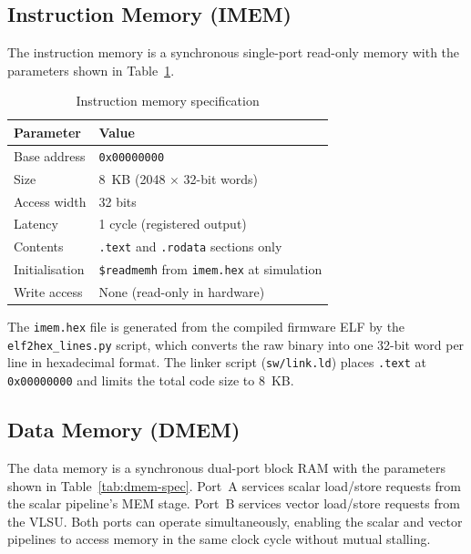 \subsection{Instruction Memory (IMEM)}

The instruction memory is a synchronous single-port read-only memory with the
parameters shown in Table~\ref{tab:imem-spec}.

\begin{table}[H]
  \centering
  \caption{Instruction memory specification}
  \label{tab:imem-spec}
  \begin{tabular}{@{}ll@{}}
    \toprule
    \textbf{Parameter} & \textbf{Value} \\
    \midrule
    Base address          & \texttt{0x00000000} \\
    Size                  & 8~KB (2048 $\times$ 32-bit words) \\
    Access width          & 32 bits \\
    Latency               & 1 cycle (registered output) \\
    Contents              & \texttt{.text} and \texttt{.rodata} sections only \\
    Initialisation        & \texttt{\$readmemh} from \texttt{imem.hex} at simulation \\
    Write access          & None (read-only in hardware) \\
    \bottomrule
  \end{tabular}
\end{table}

The \texttt{imem.hex} file is generated from the compiled firmware ELF by the
\texttt{elf2hex\_lines.py} script, which converts the raw binary into one 32-bit
word per line in hexadecimal format. The linker script (\texttt{sw/link.ld}) places
\texttt{.text} at \texttt{0x00000000} and limits the total code size to 8~KB.

\subsection{Data Memory (DMEM)}

The data memory is a synchronous dual-port block RAM with the parameters shown in
Table~\ref{tab:dmem-spec}. Port~A services scalar load/store requests from the scalar
pipeline's MEM stage. Port~B services vector load/store requests from the VLSU.
Both ports can operate simultaneously, enabling the scalar and vector pipelines to
access memory in the same clock cycle without mutual stalling.

